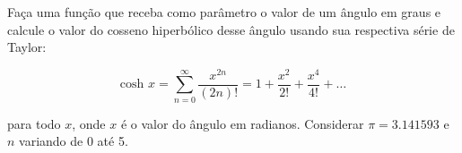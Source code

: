 
\question[10]

Faça uma função que receba como parâmetro o valor de um ângulo em graus e calcule o valor do cosseno hiperbólico desse ângulo usando sua respectiva série de Taylor:

\begin{equation*}
	\text{cosh } x = \sum_{n=0}^{\infty} \frac{x^{2n}}{(2n)!}= 1 + \frac{x^2}{2!} + \frac{x^4}{4!} + \ldots 
\end{equation*}

para todo $x$, onde $x$  é o valor do ângulo em radianos. Considerar $\pi = 3.141593$ e $n$ variando de 0 até 5.